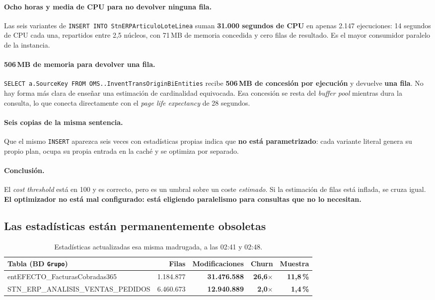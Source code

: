 \documentclass[11pt,a4paper]{article}
\newcommand{\cod}[1]{\texttt{\small #1}}
\newcommand{\critico}[1]{\textcolor{rojo}{\textbf{#1}}}
\begin{document}
\paragraph{Ocho horas y media de CPU para no devolver ninguna fila.} Las seis
variantes de \cod{INSERT INTO StnERPArticuloLoteLinea} suman \textbf{31.000
segundos de CPU} en apenas 2.147 ejecuciones: 14 segundos de CPU cada una,
repartidos entre 2,5 núcleos, con 71\,MB de memoria concedida y cero filas de
resultado. Es el mayor consumidor paralelo de la instancia.

\paragraph{506\,MB de memoria para devolver una fila.}
\cod{SELECT a.SourceKey FROM OMS..InventTransOriginBiEntities} recibe
\textbf{506\,MB de concesión por ejecución} y devuelve \textbf{una fila}. No
hay forma más clara de enseñar una estimación de cardinalidad equivocada. Esa
concesión se resta del \emph{buffer pool} mientras dura la consulta, lo que
conecta directamente con el \emph{page life expectancy} de 28 segundos.

\paragraph{Seis copias de la misma sentencia.} Que el mismo \cod{INSERT}
aparezca seis veces con estadísticas propias indica que \textbf{no está
parametrizado}: cada variante literal genera su propio plan, ocupa su propia
entrada en la caché y se optimiza por separado.

\paragraph{Conclusión.} El \emph{cost threshold} está en 100 y es correcto,
pero es un umbral sobre un coste \emph{estimado}. Si la estimación de filas
está inflada, se cruza igual. \textbf{El optimizador no está mal configurado:
está eligiendo paralelismo para consultas que no lo necesitan.}

\subsection{Las estadísticas están permanentemente obsoletas}

\begin{table}[h]
\centering
\small
\begin{tabular}{lrrrr}
\toprule
\textbf{Tabla (BD \cod{Grupo})} & \textbf{Filas} & \textbf{Modificaciones} &
\textbf{Churn} & \textbf{Muestra} \\
\midrule
entEFECTO\_FacturasCobradas365 & 1.184.877 & \critico{31.476.588} &
  \critico{26,6$\times$} & \critico{11,8\,\%} \\
STN\_ERP\_ANALISIS\_VENTAS\_PEDIDOS & 6.460.673 & \critico{12.940.889} &
  \critico{2,0$\times$} & \critico{1,4\,\%} \\
\bottomrule
\end{tabular}
\caption{Estadísticas actualizadas esa misma madrugada, a las 02:41 y 02:48.}
\end{table}
\end{document}
